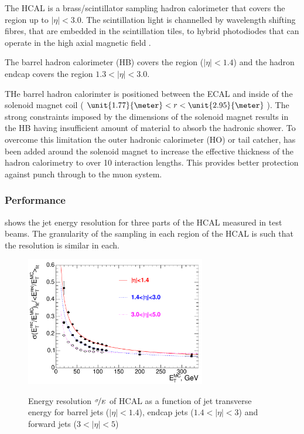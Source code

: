 The \ac{HCAL} is a brass/scintillator
sampling hadron calorimeter that covers the region up to $|\eta|<3.0$.  The
scintillation light is channelled by wavelength shifting fibres, that are
embedded in the scintillation tiles, to hybrid photodiodes that can operate in
the high axial magnetic field \cite{cms}.

The barrel hadron calorimeter (HB) covers the region ($|\eta| < 1.4$)
and the hadron endcap covers the region $1.3 < |\eta| < 3.0$.

THe barrel hadron calorimter is
positioned between the ECAL and inside of the solenoid magnet coil
($\unit{1.77}{\meter}<r<\unit{2.95}{\meter}$).
The strong constraints imposed by the dimensions of the solenoid magnet results
in the HB having insufficient amount of material to absorb the hadronic shower. 
To overcome this limitation the outer hadronic calorimeter (HO) or tail catcher,
has been added around the solenoid magnet to increase the
effective thickness of the hadron calorimetry to over 10 interaction lengths.
This provides better protection against punch through to the muon system.

\subsubsection{Performance}

 shows the jet energy resolution for three parts of
the \ac{HCAL} measured in test beams. The granularity of the sampling in each
region of the HCAL is such that the resolution is similar in each.
\begin{figure}[htbp]
  \centering
  \includegraphics[width=0.7\textwidth]{hcal_performance}
  \label{fig:hcalperform}
  \caption{Energy resolution $\nicefrac{\sigma}{E}$ of HCAL as a function of jet
transverse energy for barrel jets ($|\eta| < 1.4$), endcap jets ($1.4<|\eta| <
3$) and forward jets ($3<|\eta| < 5$) }
\end{figure}

